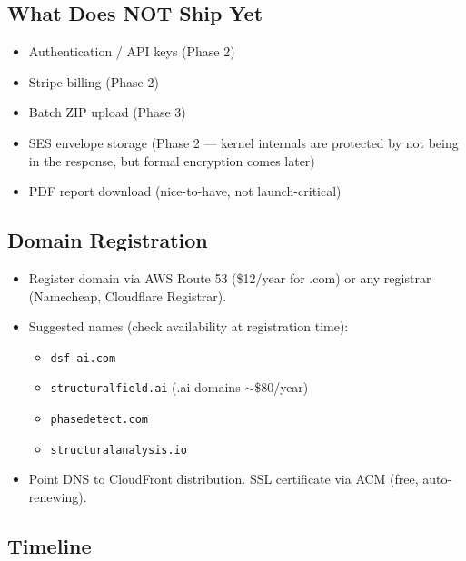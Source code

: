 \documentclass[11pt,letterpaper]{article}
\begin{document}
\subsection{What Does NOT Ship Yet}

\begin{itemize}
  \item Authentication / API keys (Phase 2)
  \item Stripe billing (Phase 2)
  \item Batch ZIP upload (Phase 3)
  \item SES envelope storage (Phase 2 --- kernel internals are
    protected by not being in the response, but formal encryption
    comes later)
  \item PDF report download (nice-to-have, not launch-critical)
\end{itemize}

\subsection{Domain Registration}


\begin{itemize}
  \item Register domain via AWS Route 53 (\$12/year for .com) or
    any registrar (Namecheap, Cloudflare Registrar).
  \item Suggested names (check availability at registration time):
    \begin{itemize}
      \item \texttt{dsf-ai.com}
      \item \texttt{structuralfield.ai} (.ai domains $\sim$\$80/year)
      \item \texttt{phasedetect.com}
      \item \texttt{structuralanalysis.io}
    \end{itemize}
  \item Point DNS to CloudFront distribution. SSL certificate via
    ACM (free, auto-renewing).
\end{itemize}

\subsection{Timeline}
\end{document}
